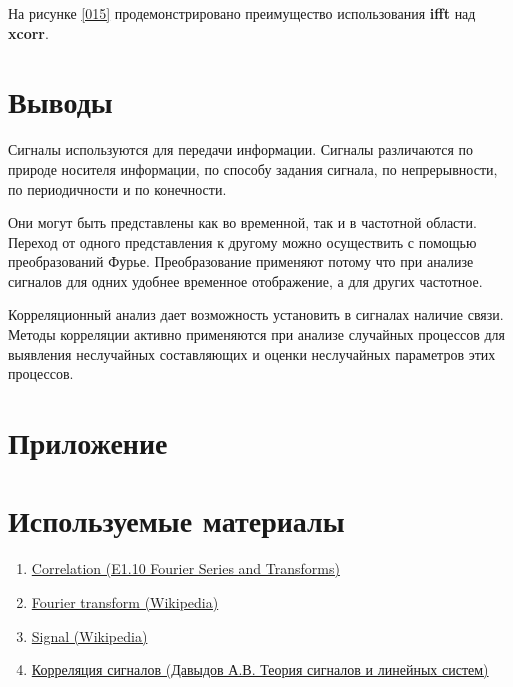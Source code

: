 \documentclass[a4paper,14pt]{extarticle}
\begin{document}
На рисунке \ref{015}  продемонстрировано преимущество использования \textbf{ifft} над \textbf{xcorr}.



\section{Выводы}

Сигналы используются для передачи информации. Сигналы 
различаются по природе носителя информации, по способу 
задания сигнала, по непрерывности, по периодичности и по 
конечности.

Они могут быть представлены как во временной, так и в 
частотной области. Переход от одного представления к другому 
можно осуществить с помощью преобразований Фурье. Преобразование применяют потому что при анализе сигналов для одних удобнее временное отображение, а для других частотное.

Корреляционный анализ дает возможность установить в сигналах наличие связи. Методы корреляции активно применяются при анализе случайных процессов для выявления неслучайных составляющих и оценки неслучайных параметров этих процессов.

\newpage

\section{Приложение}



\newpage



\newpage



\section{Используемые материалы}

\begin{enumerate}
\item \href{http://www.ee.ic.ac.uk/hp/staff/dmb/courses/E1Fourier/00800_Correlation.pdf}{Correlation (E1.10 Fourier Series and Transforms)}

\item \href{https://en.wikipedia.org/wiki/Fourier_transform}{Fourier transform (Wikipedia)}

\item \href{https://en.wikipedia.org/wiki/Signal}{Signal (Wikipedia)}

\item \href{http://bourabai.kz/signals/ts08.htm}{Корреляция сигналов (Давыдов А.В. Теория сигналов и линейных систем)}
\end{enumerate}
\end{document}
